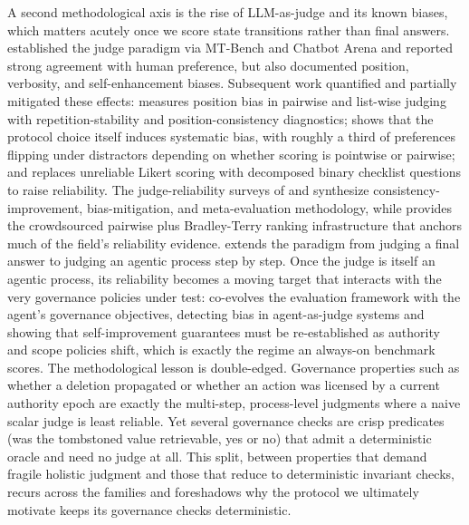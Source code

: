 A second methodological axis is the rise of LLM-as-judge and its known biases, which matters acutely once we score state transitions rather than final answers. \citet{zheng2023judgingllmasajudge} established the judge paradigm via MT-Bench and Chatbot Arena and reported strong agreement with human preference, but also documented position, verbosity, and self-enhancement biases. Subsequent work quantified and partially mitigated these effects: \citet{shi2024judgingthejudges} measures position bias in pairwise and list-wise judging with repetition-stability and position-consistency diagnostics; \citet{tripathi2025pairwiseorpointwise} shows that the protocol choice itself induces systematic bias, with roughly a third of preferences flipping under distractors depending on whether scoring is pointwise or pairwise; and \citet{lee2024checkeval} replaces unreliable Likert scoring with decomposed binary checklist questions to raise reliability. The judge-reliability surveys of \citet{gu2024surveyllmasajudge} and \citet{li2024llmsasjudgessurvey} synthesize consistency-improvement, bias-mitigation, and meta-evaluation methodology, while \citet{chiang2024chatbotarena} provides the crowdsourced pairwise plus Bradley-Terry ranking infrastructure that anchors much of the field's reliability evidence. \citet{you2026agentasjudge} extends the paradigm from judging a final answer to judging an agentic process step by step. Once the judge is itself an agentic process, its reliability becomes a moving target that interacts with the very governance policies under test: \citet{iacob2026redqueen} co-evolves the evaluation framework with the agent's governance objectives, detecting bias in agent-as-judge systems and showing that self-improvement guarantees must be re-established as authority and scope policies shift, which is exactly the regime an always-on benchmark scores. The methodological lesson is double-edged. Governance properties such as whether a deletion propagated or whether an action was licensed by a current authority epoch are exactly the multi-step, process-level judgments where a naive scalar judge is least reliable. Yet several governance checks are crisp predicates (was the tombstoned value retrievable, yes or no) that admit a deterministic oracle and need no judge at all. This split, between properties that demand fragile holistic judgment and those that reduce to deterministic invariant checks, recurs across the families and foreshadows why the protocol we ultimately motivate keeps its governance checks deterministic.

